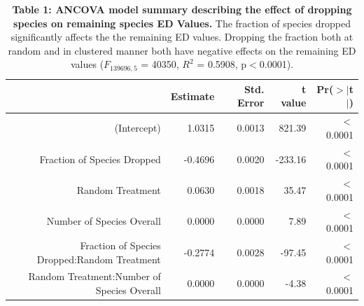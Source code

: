 \documentclass[12pt,english]{article}
\begin{document}
\begin{table}[ht]
  \centering
  \begin{tabular}{rrrrr}
    \hline
      & Estimate & Std. Error & t value & Pr($>$$|$t$|$) \\
      \hline
      (Intercept) & 1.0315 & 0.0013 & 821.39 & $<$0.0001 \\
      Fraction of Species Dropped & -0.4696 & 0.0020 & -233.16 & $<$0.0001 \\
      Random Treatment & 0.0630 & 0.0018 & 35.47 & $<$0.0001 \\
      Number of Species Overall & 0.0000 & 0.0000 & 7.89 & $<$0.0001 \\
      Fraction of Species Dropped:Random Treatment & -0.2774 & 0.0028 & -97.45 & $<$0.0001 \\
      Random Treatment:Number of Species Overall & 0.0000 & 0.0000 & -4.38 & $<$0.0001 \\
      \hline
    \hline
  \end{tabular}
\caption*{\textbf{Table 1: ANCOVA model summary describing the effect of
dropping species on remaining species ED Values.} The fraction of species
dropped significantly affects the the remaining ED values. Dropping the
fraction both at random and in clustered manner both have negative effects on
the remaining ED values ($F_{139696, 5}$ = 40350, $R^{2}$ = 0.5908,
p$<$0.0001).}
\end{table}

\end{document}
